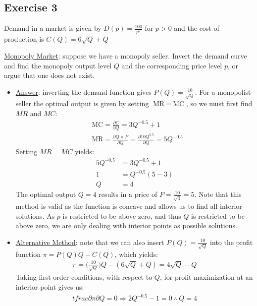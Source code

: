 \documentclass{article}
\begin{document}
\subsection{Exercise 3}
Demand in a market is given by $D(p) = \tfrac{100}{p^{2}}$ for $p > 0$ and the cost of production is $C(Q) = 6 \sqrt{Q} + Q$ \par \vspace{0.3em}
  \underline{Monopoly Market}: suppose we have a monopoly seller. Invert the demand curve and find the monopoly output level $Q$ and the corresponding price level $p$, or argue that one does not exist.
  \begin{itemize}
    \item  \underline{Answer}: inverting the demand function gives $P(Q) = \tfrac{10}{\sqrt{Q}}$. For a monopolist seller the optimal output is given by setting $\text{MR} \ = \ \text{MC}$, so we must first find $MR$ and $MC$:
    \begin{align*}
      &\text{MC} = \frac{\partial C}{\partial Q} = 3Q^{-0.5} + 1 \\
      &\text{MR} = \frac{\partial Q \times P}{\partial Q} = \frac{\partial 10Q^{0.5}}{\partial Q} = 5Q^{-0.5}
    \end{align*}
    Setting $MR = MC$ yields:
    \begin{align*}
      5Q^{-0.5} &= 3Q^{-0.5} + 1 \\
      1 &= Q^{-0.5}(5-3) \\
      Q &= 4
    \end{align*}
    The optimal output $Q = 4$ results in a price of $P = \tfrac{10}{\sqrt{4}} = 5$. Note that this method is valid as the function is concave and allows us to find all interior solutions. As $p$ is restricted to be above zero, and thus $Q$ is restricted to be above zero, we are only dealing with interior points as possible solutions.
    \item  \underline{Alternative Method}: note that we can also insert $P(Q) = \tfrac{10}{\sqrt{Q}}$ into the profit function $\pi = P(Q)Q - C(Q)$, which yields:
    \begin{gather*}
      \pi = \bigg(\frac{10}{\sqrt{Q}} \bigg)Q - (6\sqrt{Q} + Q) = 4\sqrt{Q} - Q
    \end{gather*}
    Taking first order conditions, with respect to $Q$, for profit maximization at an interior point gives us:
    \begin{gather*}
      tfrac{\partial \pi}{\partial Q} = 0 \Rightarrow 2Q^{-0.5} - 1 = 0 \ \therefore \ Q = 4
    \end{gather*}
  \end{itemize}
\end{document}
